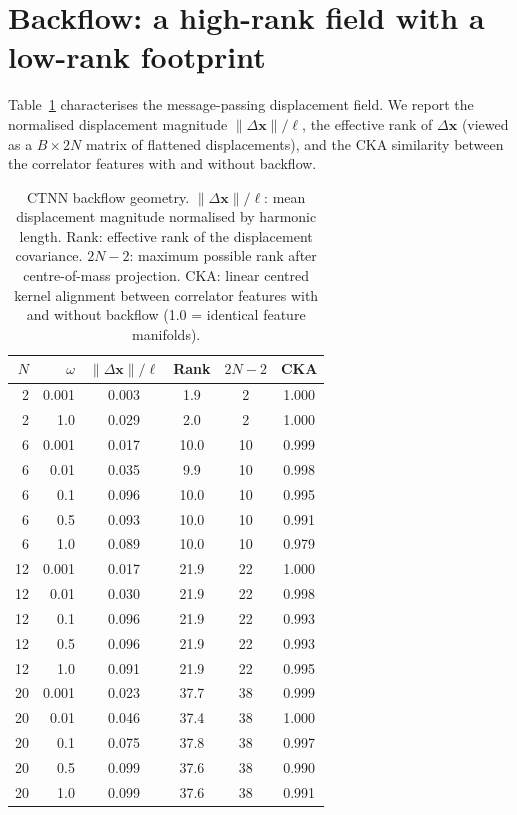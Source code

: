 \section{Backflow: a high-rank field with a low-rank footprint}
\label{sec:repr-backflow}

Table~\ref{tab:backflow-geom} characterises the message-passing displacement field.
We report the normalised displacement magnitude $\|\Delta\mathbf{x}\|/\ell$,
the effective rank of $\Delta\mathbf{x}$ (viewed as a $B\times 2N$ matrix of flattened displacements),
and the CKA similarity between the correlator features with and without backflow.

\begin{table}[t]
\centering
\caption[Backflow displacement geometry]{CTNN backflow geometry.
$\|\Delta\mathbf{x}\|/\ell$: mean displacement magnitude normalised by harmonic length.
Rank: effective rank of the displacement covariance.
$2N{-}2$: maximum possible rank after centre-of-mass projection.
CKA: linear centred kernel alignment between correlator features with and without backflow
(1.0 = identical feature manifolds).}
\label{tab:backflow-geom}
\small
\setlength{\tabcolsep}{5pt}
\begin{tabular}{rr cccc}
\toprule
$N$ & $\omega$ & $\|\Delta\mathbf{x}\|/\ell$ & Rank & $2N{-}2$ & CKA \\
\midrule
 2 & 0.001 & 0.003  & 1.9  &  2 & 1.000 \\
 2 & 1.0   & 0.029  & 2.0  &  2 & 1.000 \\
\midrule
 6 & 0.001 & 0.017  & 10.0 & 10 & 0.999 \\
 6 & 0.01  & 0.035  & 9.9  & 10 & 0.998 \\
 6 & 0.1   & 0.096  & 10.0 & 10 & 0.995 \\
 6 & 0.5   & 0.093  & 10.0 & 10 & 0.991 \\
 6 & 1.0   & 0.089  & 10.0 & 10 & 0.979 \\
\midrule
12 & 0.001 & 0.017  & 21.9 & 22 & 1.000 \\
12 & 0.01  & 0.030  & 21.9 & 22 & 0.998 \\
12 & 0.1   & 0.096  & 21.9 & 22 & 0.993 \\
12 & 0.5   & 0.096  & 21.9 & 22 & 0.993 \\
12 & 1.0   & 0.091  & 21.9 & 22 & 0.995 \\
\midrule
20 & 0.001 & 0.023  & 37.7 & 38 & 0.999 \\
20 & 0.01  & 0.046  & 37.4 & 38 & 1.000 \\
20 & 0.1   & 0.075  & 37.8 & 38 & 0.997 \\
20 & 0.5   & 0.099  & 37.6 & 38 & 0.990 \\
20 & 1.0   & 0.099  & 37.6 & 38 & 0.991 \\
\bottomrule
\end{tabular}
\end{table}

